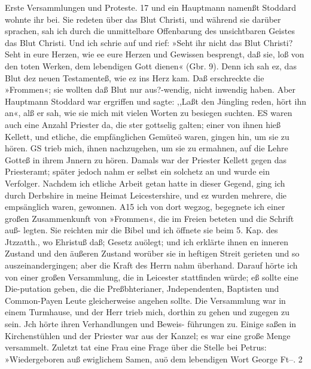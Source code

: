 Erste Versammlungen und Proteste. 17
und ein Hauptmann namenßt Stoddard wohnte ihr bei. Sie
redeten über das Blut Christi, und während sie darüber sprachen,
sah ich durch die unmittelbare Offenbarung des unsichtbaren
Geistes das Blut Christi. Und ich schrie auf und rief: »Seht
ihr nicht das Blut Christi? Seht in eure Herzen, wie ee eure
Herzen und Gewissen besprengt, daß sie, loß von den toten
Werken, dem lebendigen Gott dienen« (Gbr. 9). Denn ich sah
ez, das Blut dez neuen Testamenteß, wie ez ins Herz kam. Daß
erschreckte die »Frommen«; sie wollten daß Blut nur aus?-wendig,
nicht inwendig haben. Aber Hauptmann Stoddard war ergriffen
und sagte: ,,Laßt den Jüngling reden, hört ihn an«, alß er sah,
wie sie mich mit vielen Worten zu besiegen suchten.
ES waren auch eine Anzahl Priester da, die ster gottselig
galten; einer von ihnen hieß Kellett, und etliche, die empfänglichen
Gemüteö waren, gingen hin, um sie zu hören. GS trieb mich,
ihnen nachzugehen, um sie zu ermahnen, auf die Lehre Gotteß in
ihrem Jnnern zu hören. Damals war der Priester Kellett gegen
das Priesteramt; später jedoch nahm er selbst ein solchetz an und
wurde ein Verfolger.
Nachdem ich etliche Arbeit getan hatte in dieser Gegend,
ging ich durch Derbshire in meine Heimat Leicestershire, und
ez wurden mehrere, die empsänglich waren, gewonnen. A15 ich
von dort wegzog, begegnete ich einer großen Zusammenkunft
von »Frommen«, die im Freien beteten und die Schrift auß-
legten. Sie reichten mir die Bibel und ich öffnete sie beim 5. Kap.
des Jtzzatth., wo Ehristuß daß; Gesetz auölegt; und ich erklärte
ihnen en inneren Zustand und den äußeren Zustand worüber sie
in heftigen Streit gerieten und so auszeinandergingen; aber die
Kraft des Herrn nahm überhand.
Darauf hörte ich von einer großen Versammlung, die in
Leicester stattfinden würde; eß sollte eine Die-putation geben, die die
Preßbhterianer, Jndependenten, Baptisten und Common-Payen
Leute gleicherweise angehen sollte. Die Versammlung war in einem
Turmhause, und der Herr trieb mich, dorthin zu gehen und
zugegen zu sein. Jch hörte ihren Verhandlungen und Beweis-
führungen zu. Einige saßen in Kirchenstühlen und der Priester
war aus der Kanzel; es war eine große Menge versammelt.
Zuletzt tat eine Frau eine Frage über die Stelle bei Petrus:
»Wiedergeboren auß ewiglichem Samen, auö dem lebendigen Wort
George Ft--. 2




